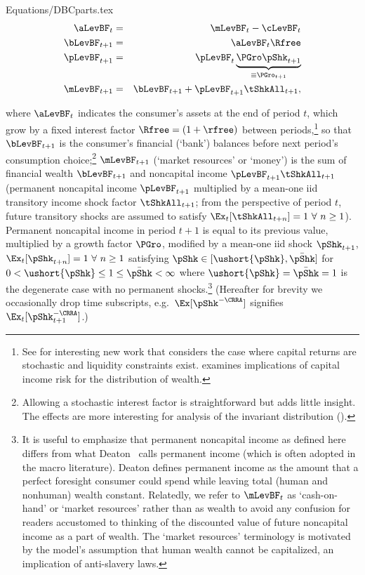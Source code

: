 \documentclass[titlepage]{\econtex}\providecommand{\texname}{BufferStockTheory}
\providecommand{\EqDir}{Equations}
\begin{document}
\begin{verbatimwrite}{\EqDir/DBCparts.tex}
\begin{eqnarray}
\aLevBF_{t}   &=&\mLevBF_{t}-\cLevBF_{t}  \label{eq:DBCparts} \\
\bLevBF_{t+1}   & = & \aLevBF_{t} \Rfree \notag \\
\pLevBF_{t+1} &=&\pLevBF_{t} \underbrace{\PGro\pShk_{t+1}}_{\equiv \PGro_{t+1}}  \notag \\
\mLevBF_{t+1} &=& \bLevBF_{t+1} +\pLevBF_{t+1}\tShkAll_{t+1},  \notag
\end{eqnarray}
\end{verbatimwrite}
 where $\aLevBF_{t}$ indicates the consumer's assets at the end of period $t$, which grow by a fixed interest factor $\Rfree =(1+\rfree)$ between periods,\footnote{See \cite{mstCapIncFluct} for interesting new work that considers the case where capital returns are stochastic and liquidity constraints exist.  \cite{benhabibWealth} examines implications of capital income risk for the distribution of wealth.}  so that $\bLevBF_{t+1}$ is the consumer's financial (`bank') balances before next period's consumption choice;\footnote{Allowing a stochastic interest factor is straightforward but adds little insight.  The effects are more interesting for analysis of the invariant distribution (\cite{szeidlInvariant}).} $\mLevBF_{t+1}$ (`market resources' or `money') is the sum of financial wealth $\bLevBF_{t+1}$ and noncapital income $\pLevBF_{t+1}\tShkAll_{t+1}$ (permanent noncapital income $\pLevBF_{t+1}$ multiplied by a mean-one iid transitory income shock factor $\tShkAll_{t+1}$; from the perspective of period $t$, future transitory shocks are assumed to satisfy $\Ex_{t}[{\tShkAll}_{t+n}]=1~\forall~n\geq 1$). Permanent noncapital income in period $t+1$ is equal to its previous value, multiplied by a growth factor $\PGro$, modified by a mean-one iid shock $\pShk_{t+1}$, $\Ex_{t}[{\pShk}_{t+n}]=1~\forall~n \geq 1$ satisfying $\pShk \in [\ushort{\pShk},\bar{\pShk}]$ for $0 < \ushort{\pShk} \leq 1 \leq \bar{\pShk} < \infty$ where $\ushort{\pShk}=\bar{\pShk}=1$ is the degenerate case with no permanent shocks.\footnote{It is useful to emphasize that permanent noncapital income as defined here differs from what Deaton~\citeyearpar{deatonUnderstandingC} calls permanent income (which is often adopted in the macro literature).  Deaton defines permanent income as the amount that a perfect foresight consumer could spend while leaving total (human and nonhuman) wealth constant.  Relatedly, we refer to $\mLevBF_{t}$ as `cash-on-hand' or `market resources' rather than as wealth to avoid any confusion for readers accustomed to thinking of the discounted value of future noncapital income as a part of wealth.  The `market resources' terminology is motivated by the model's assumption that human wealth cannot be capitalized, an implication of anti-slavery laws.}  (Hereafter for brevity we occasionally drop time subscripts, e.g.\ $\Ex[\pShk^{-\CRRA}]$ signifies $\Ex_{t}[\pShk_{t+1}^{-\CRRA}]$.)
\end{document}

